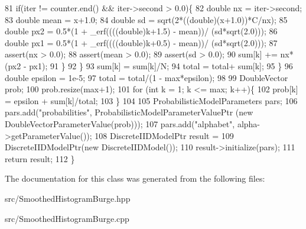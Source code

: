 \begin{DoxyCode}
81         \textcolor{keywordflow}{if}(iter != counter.end() && iter->second > 0.0)\{
82           \textcolor{keywordtype}{double} nx = iter->second;
83           \textcolor{keywordtype}{double} mean = x+1.0;
84           \textcolor{keywordtype}{double} sd = sqrt(2*((\textcolor{keywordtype}{double})(x+1.0))*C/nx);
85           \textcolor{keywordtype}{double} px2 = 0.5*(1 + \_erf((((\textcolor{keywordtype}{double})k+1.5) - mean))/ (sd*sqrt(2.0)));
86           \textcolor{keywordtype}{double} px1 = 0.5*(1 + \_erf((((\textcolor{keywordtype}{double})k+0.5) - mean))/ (sd*sqrt(2.0)));
87           assert(nx > 0.0);
88           assert(mean > 0.0);
89           assert(sd > 0.0);
90           sum[k] += nx*(px2 - px1);
91         \}
92       \}
93       sum[k] = sum[k]/N;
94       total = total+ sum[k];
95     \}
96     \textcolor{keywordtype}{double} epsilon = 1e-5;
97     total = total/(1 - max*epsilon);
98 
99     DoubleVector prob;
100     prob.resize(max+1);
101     \textcolor{keywordflow}{for} (\textcolor{keywordtype}{int} k = 1; k <= max; k++)\{
102       prob[k] = epsilon + sum[k]/total;
103     \}
104 
105     ProbabilisticModelParameters pars;
106     pars.add(\textcolor{stringliteral}{"probabilities"}, ProbabilisticModelParameterValuePtr (\textcolor{keyword}{new} DoubleVectorParameterValue(prob)));
107     pars.add(\textcolor{stringliteral}{"alphabet"}, alpha->getParameterValue());
108     DiscreteIIDModelPtr result =
109       DiscreteIIDModelPtr(\textcolor{keyword}{new} DiscreteIIDModel());
110     result->initialize(pars);
111     \textcolor{keywordflow}{return} result;
112   \}
\end{DoxyCode}


The documentation for this class was generated from the following files\+:\begin{DoxyCompactItemize}
\item 
src/Smoothed\+Histogram\+Burge.\+hpp\item 
src/Smoothed\+Histogram\+Burge.\+cpp\end{DoxyCompactItemize}
